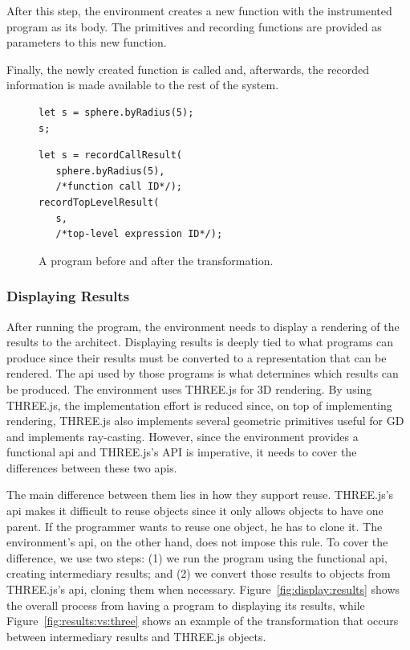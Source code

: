 After this step, the environment creates a new function with the instrumented program as its body.
The primitives and recording functions are provided as parameters to this new function.

Finally, the newly created function is called and, afterwards, the recorded information is made available to the rest of the system.

\begin{figure}
  \centering
\begin{minipage}[t]{0.45\linewidth}
  \begin{verbatim}
let s = sphere.byRadius(5);
s;
  \end{verbatim}
\end{minipage}
\hspace{0.05\linewidth}
\begin{minipage}[t]{0.45\linewidth}
  \begin{verbatim}
let s = recordCallResult(
   sphere.byRadius(5),
   /*function call ID*/);
recordTopLevelResult(
   s,
   /*top-level expression ID*/);
  \end{verbatim}
\end{minipage}
  \caption{A program before and after the transformation.}
  \label{fig:instrument:example}
\end{figure}


\subsubsection{Displaying Results}
After running the program, the environment needs to display a rendering of the results to the architect.
Displaying results is deeply tied to what programs can produce since their results must be converted to a representation that can be rendered.
The \gls{api} used by those programs is what determines which results can be produced.
The environment uses THREE.js for 3D rendering.
By using THREE.js, the implementation effort is reduced since, on top of implementing rendering, THREE.js also implements several geometric primitives useful for GD and implements ray-casting.
However, since the environment provides a functional \gls{api} and THREE.js's API is imperative, it needs to cover the differences between these two \glspl{api}.

The main difference between them lies in how they support reuse.
THREE.js's \gls{api} makes it difficult to reuse objects since it only allows objects to have one parent.
If the programmer wants to reuse one object, he has to clone it.
The environment's \gls{api}, on the other hand, does not impose this rule.
To cover the difference, we use two steps:
(1) we run the program using the functional \gls{api}, creating intermediary results;
and (2) we convert those results to objects from THREE.js's \gls{api}, cloning them when necessary.
Figure~\ref{fig:display:results} shows the overall process from having a program to displaying its results, while Figure~\ref{fig:results:vs:three} shows an example of the transformation that occurs between intermediary results and THREE.js objects.

